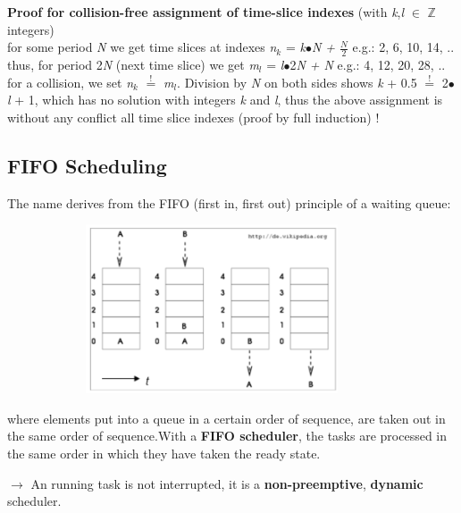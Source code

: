 \textbf{Proof for collision-free assignment of time-slice indexes } (with \textit{k},\textit{l} $\in$ \textbf{$\boldsymbol{\mathbb{Z}}$}  integers)\\

for some period \textit{N} we get time slices at indexes  \textit{n${}_{k}$}  =  \textit{k$\bullet$N  +  $\frac{N}{2} $}  e.g.: 2, 6, 10, 14, ..\\

thus, for period 2\textit{N} (next time slice) we get    \textit{m${}_{l}$} =  \textit{l$\bullet$}2\textit{N  +  N  }e.g.: 4, 12, 20, 28, ..\\

for a collision, we set \textit{n${}_{k}$} ${\mathop{=}\limits^{!}} $ \textit{m${}_{l}$}. Division by \textit{N} on both sides shows \textit{k} + 0.5 ${\mathop{=}\limits^{!}} $ 2$\mathrm{\bullet}$\textit{l} + 1, which has no solution with integers \textit{k} and \textit{l}, thus the above assignment is without any conflict all time slice indexes (proof by full induction) !
\newpage

\subsection{FIFO Scheduling}

The name derives from the FIFO (first in, first out) principle of a waiting queue:    

 	\begin{figure}[h]
    \centering
    \includegraphics[width=10cm, height=5cm]{Images/image97.png}
    \label{fig:Fig 42}
    \end{figure}

where elements put into a queue in a certain order of sequence, are taken out in the same order of sequence.With a \textbf{FIFO scheduler}, the tasks are processed in the same order in which they have taken the ready state.  

$\rightarrow$ An running task is not interrupted, it is a \textbf{non-preemptive}, \textbf{dynamic} scheduler.\\

